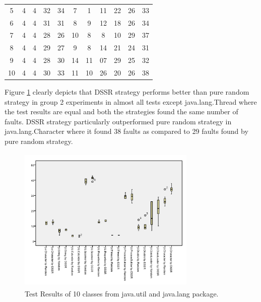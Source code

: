 \begin{table}[ht]
\begin{tabular}{| c | c | c | c | c | c | c | c | c | c | c |}
5 & 4 & 4 & 32 & 34 & 7 & 1 & 11 & 22 & 26 & 33\\

6 & 4 & 4 & 31 & 31 & 8 & 9 & 12 & 18 & 26 & 34\\

7 & 4 & 4 & 28 & 26 & 10 & 8 & 8 & 10 & 29 & 37\\

8 & 4 & 4 & 29 & 27 & 9 & 8 & 14 & 21 & 24 & 31\\

9 & 4 & 4 & 28 & 30 & 14 & 11 & 07 & 29 & 25 & 32\\ 

10 & 4 & 4 & 30 & 33 & 11 & 10 & 26 & 20 & 26 & 38\\ [1ex] %

\hline %
\end{tabular}
\label{table:tenb} %
\end{table}

\newpage

Figure \ref{fig:Result2} clearly depicts that DSSR strategy performs better than pure random strategy in group 2 experiments in almost all tests except java.lang.Thread where the test results are equal and both the strategies found the same number of faults. DSSR strategy particularly outperformed pure random strategy in java.lang.Character where it found 38 faults as compared to 29 faults found by pure random strategy.\\

\begin{figure}[htp]
\centering
\includegraphics[width=8.5cm,height=7cm]{figures/javatests.png}
\caption{Test Results of 10 classes from java.util and java.lang package.}
\label{fig:Result2}
\end{figure}

